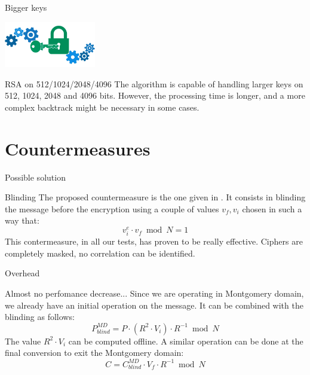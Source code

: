 \documentclass[aspectratio=43]{beamer}
\begin{document}
\begin{frame}{Bigger keys}
  \begin{center}
    \includegraphics[width=4cm]{./graphics/key}
  \end{center}
  \begin{block}{RSA on 512/1024/2048/4096}
		The algorithm is capable of handling larger keys on 512, 1024, 2048 and 4096 bits.
    However, the processing time is longer, and a more complex backtrack might be necessary in some cases.
	\end{block}
\end{frame}



\section{Countermeasures}
\begin{frame}{Possible solution}
    \begin{block}{Blinding}
		The proposed countermeasure is the one given in \cite{kocher1996timing}.
		It consists in blinding the message before the encryption using a couple of values $v_f, v_i$ chosen in such a way that:
		\begin{equation*}
			v_i^e \cdot v_f \bmod N = 1
		\end{equation*}
        This contermeasure, in all our tests, has proven to be really effective. Ciphers are completely masked, no correlation can be identified.
    \end{block}
\end{frame}

\begin{frame}[c]{Overhead}
  \begin{block}{Almost no perfomance decrease...}
    Since we are operating in Montgomery domain, we already have an initial operation on the message. It can be combined with the blinding as follows:
    \begin{equation*}
      P_{blind}^{MD} = P \cdot ( R^2 \cdot V_i ) \cdot R^{-1} \bmod N
    \end{equation*}
    The value $R^2 \cdot V_i$ can be computed offline.
    A similar operation can be done at the final conversion to exit the Montgomery domain:
    \begin{equation*}
      C = C_{blind}^{MD} \cdot V_f \cdot R^{-1} \bmod N
    \end{equation*}
  \end{block}
\end{frame}
\end{document}
